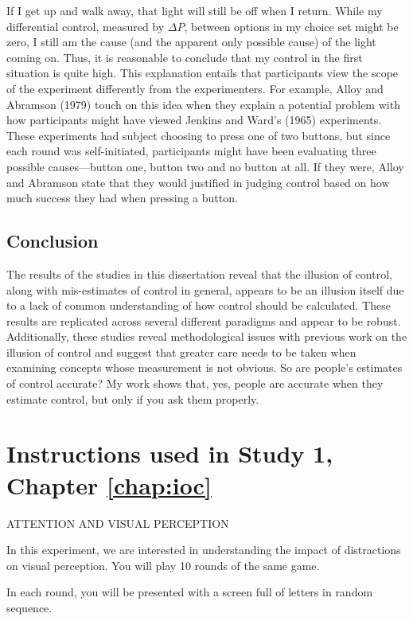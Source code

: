 \documentclass[USenglish,letterpaper,12pt,extrafontsizes,oneside,onecolumn,final]{memoir}
\newcommand{\deltap}{$\Delta P$}
\begin{document}
 If I get up and walk away, that light will still be off when I return. While my differential control, measured by \deltap, between options in my choice set might be zero, I still am the cause (and the apparent only possible cause) of the light coming on.  Thus, it is reasonable to conclude that my control in the first situation is quite high. This explanation entails that participants view the scope of the experiment differently from the experimenters.  For example, Alloy and Abramson (1979) touch on this idea when they explain a potential problem with how participants might have viewed Jenkins and Ward's (1965) experiments.  These experiments had subject choosing to press one of two buttons, but since each round was self-initiated, participants might have been evaluating three possible causes---button one, button two and no button at all.  If they were, Alloy and Abramson state that they would justified in judging control based on how much success they had when pressing a button.

\section{Conclusion} 
The results of the studies in this dissertation reveal that the illusion of control, along with mis-estimates of control in general, appears to be an illusion itself due to a lack of common understanding of how control should be calculated. These results are replicated across several different paradigms and appear to be robust.  Additionally, these studies reveal methodological issues with previous work on the illusion of control and suggest that greater care needs to be taken when examining concepts whose measurement is not obvious. So are people's estimates of control accurate? My work shows that, yes, people are accurate when they estimate control, but only if you ask them properly.

\appendix
\chapter{Instructions used in Study 1, Chapter \ref{chap:ioc}}
\label{app:study-1-instructions}
ATTENTION AND VISUAL PERCEPTION

In this experiment, we are interested in understanding the impact of distractions on visual perception. You will play 10 rounds of the same game.  

In each round, you will be presented with a screen full of letters in random sequence. 
\end{document}
